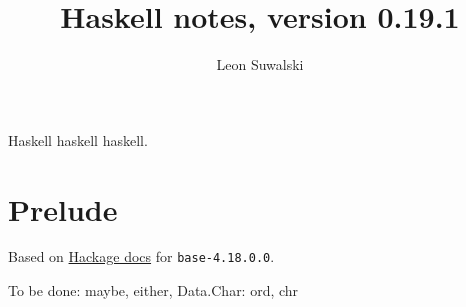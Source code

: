 \documentclass{charun}
\title{Haskell notes, version 0.19.1}
\author{Leon Suwalski}
\begin{document}
\begin{multicols*}{3}
\maketitle
\raggedright
Haskell haskell haskell.
\section{Prelude}
Based on \href{https://hackage.haskell.org/package/base-4.18.0.0/docs/Prelude.html}{Hackage docs} for \texttt{base-4.18.0.0}.















\newpage














To be done: maybe, either, 
Data.Char: ord, chr


\end{multicols*}
\end{document}
